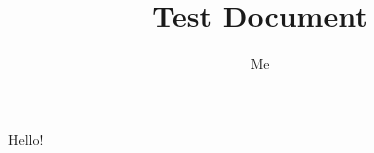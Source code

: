 \documentclass{article}
\title{Test Document}
\author{Me}
\begin{document}
\maketitle

Hello!
\end{document}
